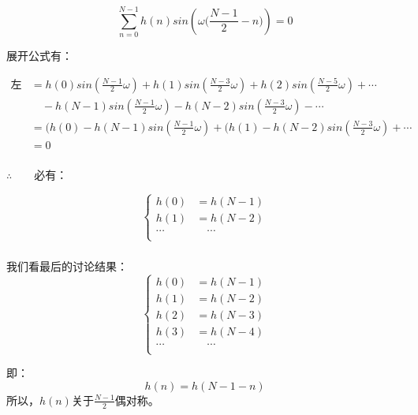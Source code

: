 \documentclass[notheorems,compress,mathserif,table]{beamer}
\begin{document}
\begin{frame}[shrink]\frametitle{}%
        $$\sum_{n=0}^{N-1}h(n)sin\left(\omega\Big(\frac{N-1}{2}-n\Big)\right)=0$$

        展开公式有：

        \begin{equation*}
            \begin{split}
        \mbox{左边}
                 &=h(0)sin(\frac{N-1}{2}\omega) + h(1)sin(\frac{N-3}{2}\omega) + h(2)sin(\frac{N-5}{2}\omega)+\cdots\\
                 \quad& \quad-h(N-1)sin(\frac{N-1}{2}\omega)- h(N-2)sin(\frac{N-3}{2}\omega)-\cdots\\
                 &=(h(0)-h(N-1)sin(\frac{N-1}{2}\omega) + (h(1)-h(N-2)sin(\frac{N-3}{2}\omega)+ \cdots\\
                 & = 0\\
          \end{split}
        \end{equation*}

        $\therefore\quad\quad$必有：

        $$
        \left\{ \begin{aligned}
            h(0)  &=  h(N-1)\\
            h(1)  &=  h(N-2)\\
            \cdots &\quad \cdots \\
        \end{aligned} \right.
        $$
\end{frame}



\begin{frame}\frametitle{}%
我们看最后的讨论结果：
          $$
        \left\{ \begin{aligned}
            h(0)  &=  h(N-1)\\
            h(1)  &=  h(N-2)\\
            h(2)  &=  h(N-3)\\
            h(3)  &=  h(N-4)\\
            \cdots &\quad \cdots \\
        \end{aligned} \right.
        $$

        即：   $$h(n) = h(N-1-n)$$
        所以，$h(n)$关于$\frac{N-1}{2}$偶对称。
\end{frame}
\end{document}
